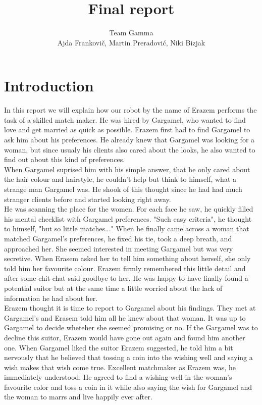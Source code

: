 \documentclass[12pt,a4paper]{article}
\author{Team Gamma \\ {\small Ajda Frankovič, Martin Preradović, Niki Bizjak}}
\title{Final report}
\date{}
\begin{document}
	
	\maketitle
	
	\section{Introduction}
	In this report we will explain how our robot by the name of Erazem performs the task of a skilled match maker. He was hired by Gargamel, who wanted to find love and get married as quick as possible. Erazem first had to find Gargamel to ask him about his preferences. He already knew that Gargamel was looking for a woman, but since usualy his clients also cared about the looks, he also wanted to find out about this kind of preferences. \\
	
	When Gargamel suprised him with his simple answer, that he only cared about the hair colour and hairstyle, he couldn't help but think to himself, what a strange man Gargamel was. He shook of this thought since he had had much stranger clients before and started looking right away. \\

	He was scanning the place for the women. For each face he saw, he quickly filled his mental checklist with Gargamel preferences. "Such easy criteria", he thought to himself, "but so little matches..." When he finally came across a woman that matched Gargamel's preferences, he fixed his tie, took a deep breath, and approached her. She seemed interested in meeting Gargamel but was very secretive. When Erasem asked her to tell him something about herself, she only told him her favourite colour. Erazem firmly remembered this little detail and after some chit-chat said goodbye to her. He was happy to have finally found a potential suitor but at the same time a little worried about the lack of information he had about her. \\
	
	Erazem thought it is time to report to Gargamel about his findings. They met at Gargamel's and Erasem told him all he knew about that woman. It was up to Gargamel to decide wheteher she seemed promising or no. If the Gargamel was to decline this suitor, Erazem would have gone out again and found him another one. When Gargamel liked the suitor Erazem suggested, he told him a bit nervously that he believed that tossing a coin into the wishing well and saying a wish makes that wish come true. Excellent matchmaker as Erazem was, he immediately understood. He agreed to find a wishing well in the woman's favourite color and toss a coin in it while also saying the wish for Gargamel and the woman to marrs and live happily ever after. \\
\end{document}
